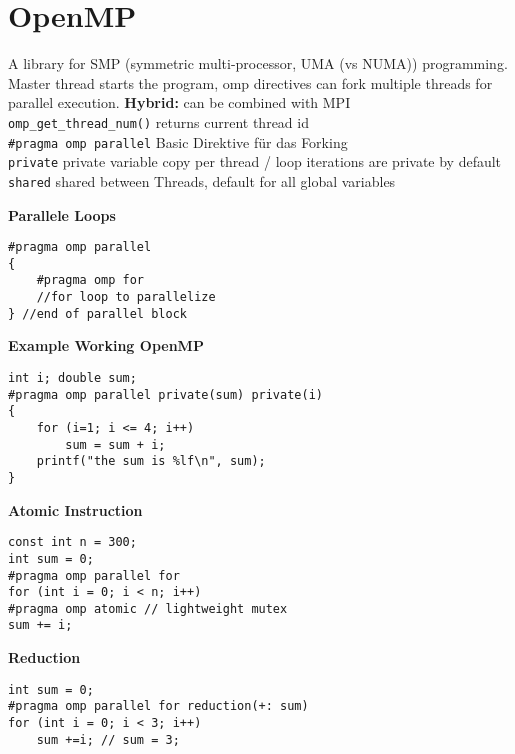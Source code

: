 \section{OpenMP}
A library for SMP (symmetric multi-processor, UMA (vs NUMA)) programming. Master thread starts the program, omp directives can fork multiple threads for parallel execution.
\textbf{Hybrid:} can be combined with MPI \\
\texttt{omp\_get\_thread\_num()} returns current thread id\\
\texttt{\#pragma omp parallel} Basic Direktive für das Forking \\
\texttt{private} private variable copy per thread / loop iterations are private by default \\
\texttt{shared} shared between Threads, default for all global variables 

\textbf{Parallele Loops}
\begin{lstlisting}[style=csharp]
#pragma omp parallel 
{
	#pragma omp for 
	//for loop to parallelize 
} //end of parallel block 
\end{lstlisting}

\textbf{Example Working OpenMP}
\begin{lstlisting}[style=csharp]
int i; double sum;
#pragma omp parallel private(sum) private(i)
{
	for (i=1; i <= 4; i++)
    	sum = sum + i;
    printf("the sum is %lf\n", sum);
}
\end{lstlisting}

\textbf{Atomic Instruction}
\begin{lstlisting}[style=csharp]
const int n = 300;
int sum = 0;
#pragma omp parallel for
for (int i = 0; i < n; i++) 
#pragma omp atomic // lightweight mutex
sum += i;
\end{lstlisting}

\textbf{Reduction}
\begin{lstlisting}[style=csharp]
int sum = 0;
#pragma omp parallel for reduction(+: sum)
for (int i = 0; i < 3; i++)
	sum +=i; // sum = 3;
\end{lstlisting}